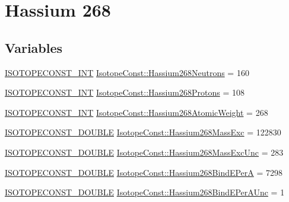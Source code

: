 \hypertarget{group___isotope_const-_hassium-_hs268}{}\section{Hassium 268}
\label{group___isotope_const-_hassium-_hs268}
\subsection*{Variables}
\begin{DoxyCompactItemize}
\item 
\mbox{\hyperlink{group___isotope_const-_macros_ga5f18360b3e99483a35c32d789e62621c}{I\+S\+O\+T\+O\+P\+E\+C\+O\+N\+S\+T\+\_\+\+I\+NT}} \mbox{\hyperlink{group___isotope_const-_hassium-_hs268_gad9e3555f55caf2ad578a85fa415a3c31}{Isotope\+Const\+::\+Hassium268\+Neutrons}} = 160
\item 
\mbox{\hyperlink{group___isotope_const-_macros_ga5f18360b3e99483a35c32d789e62621c}{I\+S\+O\+T\+O\+P\+E\+C\+O\+N\+S\+T\+\_\+\+I\+NT}} \mbox{\hyperlink{group___isotope_const-_hassium-_hs268_ga0972b9a84fa184b7d216f77e1bf3d2c7}{Isotope\+Const\+::\+Hassium268\+Protons}} = 108
\item 
\mbox{\hyperlink{group___isotope_const-_macros_ga5f18360b3e99483a35c32d789e62621c}{I\+S\+O\+T\+O\+P\+E\+C\+O\+N\+S\+T\+\_\+\+I\+NT}} \mbox{\hyperlink{group___isotope_const-_hassium-_hs268_ga92d691d2b9ba5515675681b3efcec319}{Isotope\+Const\+::\+Hassium268\+Atomic\+Weight}} = 268
\item 
\mbox{\hyperlink{group___isotope_const-_macros_ga8f45a7272ce02c0b4c65c44636ed719a}{I\+S\+O\+T\+O\+P\+E\+C\+O\+N\+S\+T\+\_\+\+D\+O\+U\+B\+LE}} \mbox{\hyperlink{group___isotope_const-_hassium-_hs268_ga5e6d6327fcdd2d3dd9dffd70e379df58}{Isotope\+Const\+::\+Hassium268\+Mass\+Exc}} = 122830
\item 
\mbox{\hyperlink{group___isotope_const-_macros_ga8f45a7272ce02c0b4c65c44636ed719a}{I\+S\+O\+T\+O\+P\+E\+C\+O\+N\+S\+T\+\_\+\+D\+O\+U\+B\+LE}} \mbox{\hyperlink{group___isotope_const-_hassium-_hs268_gaa6e74944f4f5ff068cb2200e9b577d48}{Isotope\+Const\+::\+Hassium268\+Mass\+Exc\+Unc}} = 283
\item 
\mbox{\hyperlink{group___isotope_const-_macros_ga8f45a7272ce02c0b4c65c44636ed719a}{I\+S\+O\+T\+O\+P\+E\+C\+O\+N\+S\+T\+\_\+\+D\+O\+U\+B\+LE}} \mbox{\hyperlink{group___isotope_const-_hassium-_hs268_ga7fb6ce53ec7021db869be43025a2e160}{Isotope\+Const\+::\+Hassium268\+Bind\+E\+PerA}} = 7298
\item 
\mbox{\hyperlink{group___isotope_const-_macros_ga8f45a7272ce02c0b4c65c44636ed719a}{I\+S\+O\+T\+O\+P\+E\+C\+O\+N\+S\+T\+\_\+\+D\+O\+U\+B\+LE}} \mbox{\hyperlink{group___isotope_const-_hassium-_hs268_ga4740af3dadcbda0c1383bb5ce42073e1}{Isotope\+Const\+::\+Hassium268\+Bind\+E\+Per\+A\+Unc}} = 1

\end{DoxyCompactItemize}
